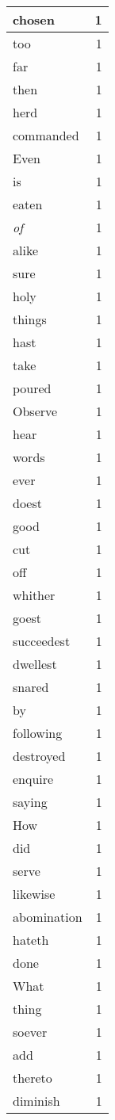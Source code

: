 \begin{center}
\begin{longtable}{l|r}
chosen & 1 \\ \hline
too & 1 \\ \hline
far & 1 \\ \hline
then & 1 \\ \hline
herd & 1 \\ \hline
commanded & 1 \\ \hline
Even & 1 \\ \hline
is & 1 \\ \hline
eaten & 1 \\ \hline
\emph{of} & 1 \\ \hline
alike & 1 \\ \hline
sure & 1 \\ \hline
holy & 1 \\ \hline
things & 1 \\ \hline
hast & 1 \\ \hline
take & 1 \\ \hline
poured & 1 \\ \hline
Observe & 1 \\ \hline
hear & 1 \\ \hline
words & 1 \\ \hline
ever & 1 \\ \hline
doest & 1 \\ \hline
good & 1 \\ \hline
cut & 1 \\ \hline
off & 1 \\ \hline
whither & 1 \\ \hline
goest & 1 \\ \hline
succeedest & 1 \\ \hline
dwellest & 1 \\ \hline
snared & 1 \\ \hline
by & 1 \\ \hline
following & 1 \\ \hline
destroyed & 1 \\ \hline
enquire & 1 \\ \hline
saying & 1 \\ \hline
How & 1 \\ \hline
did & 1 \\ \hline
serve & 1 \\ \hline
likewise & 1 \\ \hline
abomination & 1 \\ \hline
hateth & 1 \\ \hline
done & 1 \\ \hline
What & 1 \\ \hline
thing & 1 \\ \hline
soever & 1 \\ \hline
add & 1 \\ \hline
thereto & 1 \\ \hline
diminish & 1 \\ \hline
\end{longtable}
\end{center}



